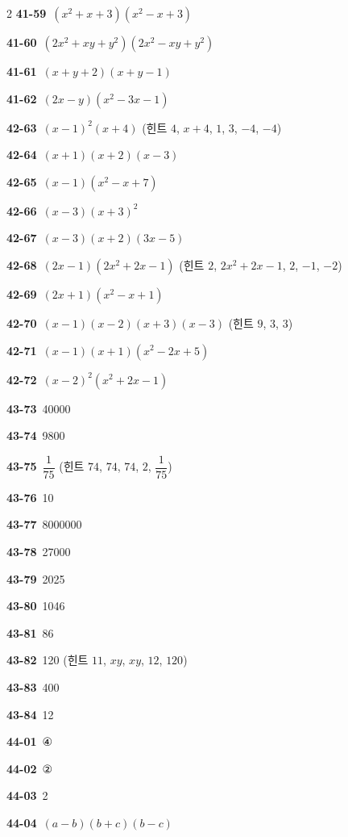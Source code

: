 \documentclass[10pt,a4paper]{article}
\begin{document}
\begin{multicols}{2}
\noindent\textbf{41-59}\ $(x^2+x+3)(x^2-x+3)$\par
\noindent\textbf{41-60}\ $(2x^2+xy+y^2)(2x^2-xy+y^2)$\par
\noindent\textbf{41-61}\ $(x+y+2)(x+y-1)$\par
\noindent\textbf{41-62}\ $(2x-y)(x^2-3x-1)$\par
\noindent\textbf{42-63}\ $(x-1)^2(x+4)$ (힌트 $4$, $x+4$, $1$, $3$, $-4$, $-4$)\par
\noindent\textbf{42-64}\ $(x+1)(x+2)(x-3)$\par
\noindent\textbf{42-65}\ $(x-1)(x^2-x+7)$\par
\noindent\textbf{42-66}\ $(x-3)(x+3)^2$\par
\noindent\textbf{42-67}\ $(x-3)(x+2)(3x-5)$\par
\noindent\textbf{42-68}\ $(2x-1)(2x^2+2x-1)$ (힌트 $2$, $2x^2+2x-1$, $2$, $-1$, $-2$)\par
\noindent\textbf{42-69}\ $(2x+1)(x^2-x+1)$\par
\noindent\textbf{42-70}\ $(x-1)(x-2)(x+3)(x-3)$ (힌트 $9$, $3$, $3$)\par
\noindent\textbf{42-71}\ $(x-1)(x+1)(x^2-2x+5)$\par
\noindent\textbf{42-72}\ $(x-2)^2(x^2+2x-1)$\par
\noindent\textbf{43-73}\ 40000\par
\noindent\textbf{43-74}\ 9800\par
\noindent\textbf{43-75}\ $\dfrac{1}{75}$ (힌트 $74$, $74$, $74$, $2$, $\dfrac{1}{75}$)\par
\noindent\textbf{43-76}\ 10\par
\noindent\textbf{43-77}\ 8000000\par
\noindent\textbf{43-78}\ 27000\par
\noindent\textbf{43-79}\ 2025\par
\noindent\textbf{43-80}\ 1046\par
\noindent\textbf{43-81}\ 86\par
\noindent\textbf{43-82}\ 120 (힌트 $11$, $xy$, $xy$, $12$, $120$)\par
\noindent\textbf{43-83}\ 400\par
\noindent\textbf{43-84}\ 12\par
\noindent\textbf{44-01}\ ④\par
\noindent\textbf{44-02}\ ②\par
\noindent\textbf{44-03}\ 2\par
\noindent\textbf{44-04}\ $(a-b)(b+c)(b-c)$\par

\end{multicols}
\end{document}
